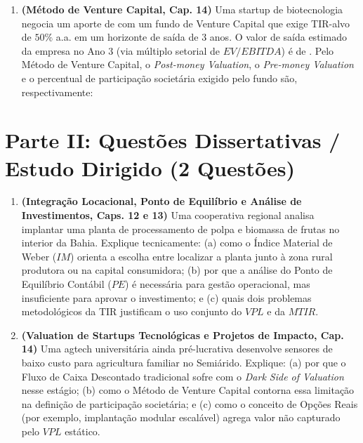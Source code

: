 \begin{enumerate}[leftmargin=1.6em, itemsep=8pt]
  \item \textbf{(Método de Venture Capital, Cap. 14)} Uma startup de biotecnologia negocia um aporte de  com um fundo de Venture Capital que exige TIR-alvo de $50\%$ a.a. em um horizonte de saída de $3$ anos. O valor de saída estimado da empresa no Ano $3$ (via múltiplo setorial de $EV/EBITDA$) é de . Pelo Método de Venture Capital, o \textit{Post-money Valuation}, o \textit{Pre-money Valuation} e o percentual de participação societária exigido pelo fundo são, respectivamente:

\end{enumerate}

\section*{Parte II: Questões Dissertativas / Estudo Dirigido (2 Questões)}

\begin{enumerate}[leftmargin=1.6em, itemsep=8pt]
  \item \textbf{(Integração Locacional, Ponto de Equilíbrio e Análise de Investimentos, Caps. 12 e 13)} Uma cooperativa regional analisa implantar uma planta de processamento de polpa e biomassa de frutas no interior da Bahia. Explique tecnicamente: (a) como o Índice Material de Weber ($IM$) orienta a escolha entre localizar a planta junto à zona rural produtora ou na capital consumidora; (b) por que a análise do Ponto de Equilíbrio Contábil ($PE$) é necessária para gestão operacional, mas insuficiente para aprovar o investimento; e (c) quais dois problemas metodológicos da TIR justificam o uso conjunto do $VPL$ e da $MTIR$. \espacoResolucao[2.6cm]

  \item \textbf{(Valuation de Startups Tecnológicas e Projetos de Impacto, Cap. 14)} Uma agtech universitária ainda pré-lucrativa desenvolve sensores de baixo custo para agricultura familiar no Semiárido. Explique: (a) por que o Fluxo de Caixa Descontado tradicional sofre com o \textit{Dark Side of Valuation} nesse estágio; (b) como o Método de Venture Capital contorna essa limitação na definição de participação societária; e (c) como o conceito de Opções Reais (por exemplo, implantação modular escalável) agrega valor não capturado pelo $VPL$ estático. \espacoResolucao[2.6cm]
\end{enumerate}

